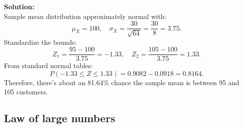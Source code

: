 \documentclass{book}
\begin{document}
\begin{enumerate}
    \textbf{Solution:} \\
    Sample mean distribution approximately normal with:
    \[
    \mu_{\bar{X}} = 100, \quad \sigma_{\bar{X}} = \frac{30}{\sqrt{64}} = \frac{30}{8} = 3.75.
    \]
    Standardize the bounds:
    \[
    Z_1 = \frac{95 - 100}{3.75} = -1.33, \quad Z_2 = \frac{105 - 100}{3.75} = 1.33.
    \]
    From standard normal tables:
    \[
    P(-1.33 \leq Z \leq 1.33) = 0.9082 - 0.0918 = 0.8164.
    \]
    Therefore, there's about an 81.64\% chance the sample mean is between 95 and 105 customers.

\end{enumerate}

\subsection*{Law of large numbers}
\end{document}
